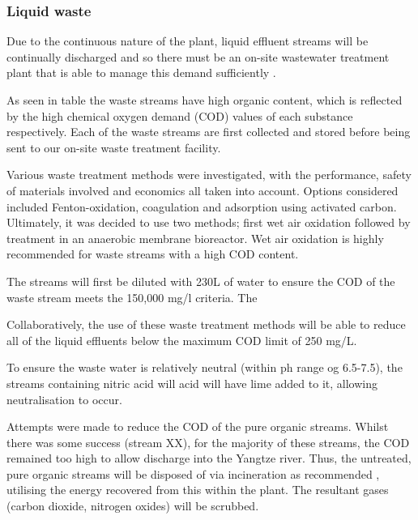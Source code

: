 \subsubsection{Liquid waste }

Due to the continuous nature of the plant, liquid effluent streams will be continually discharged and so there must be an on-site wastewater treatment plant that is able to manage this demand sufficiently \cite{water_innovations_inc_continuous_2021}.  

As seen in table %
the waste streams have high organic content, which is reflected by the high chemical oxygen demand (COD) values of each substance respectively. Each of the waste streams are first collected and stored before being sent to our on-site waste treatment facility. 

Various waste treatment methods were investigated, with the performance,  safety of materials involved and economics all taken into account. Options considered included Fenton-oxidation, coagulation and adsorption using activated carbon. Ultimately, it was decided to use two methods; first wet air oxidation followed by treatment in an anaerobic membrane bioreactor. Wet air oxidation is highly recommended for waste streams with a high COD content. 

The streams will first be diluted with 230L of water to ensure the COD of the waste stream meets the 150,000 mg/l criteria. The 






Collaboratively, the use of these waste treatment methods will be able to reduce all of the liquid effluents below the maximum COD limit of 250 mg/L. 

To ensure the waste water is relatively neutral (within ph range og 6.5-7.5), the streams containing nitric acid will acid will have lime added to it, allowing neutralisation to occur. 





Attempts were made to reduce the COD of the pure organic streams. Whilst there was some success (stream XX), for the majority of these streams, the COD remained too high to allow discharge into the Yangtze river. Thus, the untreated, pure organic streams will be disposed of via incineration as recommended \cite{sinnott_coulson_2005}, utilising the energy recovered from this within the plant. The resultant gases (carbon dioxide, nitrogen oxides) will be scrubbed. 

